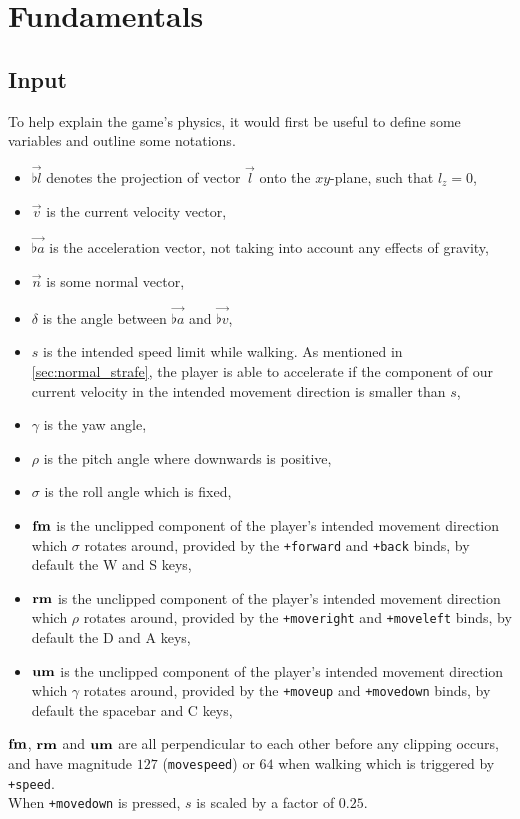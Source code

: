 \section{Fundamentals}
\label{sec:fundamentals}
\cite{hl_physics}

\subsection{Input}
\label{sec:input}
To help explain the game's physics, it would first be useful to define some variables and outline some notations.
\begin{itemize}
\item $\vec{\flat{l}}$ denotes the projection of vector $\vec{l}$ onto the $xy$-plane, such that $l_z = 0$,
\item $\vec{v}$ is the current velocity vector,
\item $\vec{\flat{a}}$ is the acceleration vector, not taking into account any effects of gravity,
\item $\vec{n}$ is some normal vector,
\item $\delta$ is the angle between $\vec{\flat{a}}$ and $\vec{\flat{v}}$,
\item $s$ is the intended speed limit while walking. As mentioned in \ref{sec:normal_strafe}, the player is able to accelerate if the component of our current velocity in the intended movement direction is smaller than $s$,
\item $\gamma$ is the yaw angle,
\item $\rho$ is the pitch angle where downwards is positive,
\item $\sigma$ is the roll angle which is fixed,
\item $\boldsymbol{\operatorname{fm}}$ is the unclipped component of the player's intended movement direction which $\sigma$ rotates around, provided by the \texttt{+forward} and \texttt{+back} binds, by default the W and S keys,
\item $\boldsymbol{\operatorname{rm}}$ is the unclipped component of the player's intended movement direction which $\rho$ rotates around, provided by the \texttt{+moveright} and \texttt{+moveleft} binds, by default the D and A keys,
\item $\boldsymbol{\operatorname{um}}$ is the unclipped component of the player's intended movement direction which $\gamma$ rotates around, provided by the \texttt{+moveup} and \texttt{+movedown} binds, by default the spacebar and C keys,
\end{itemize}

$\boldsymbol{\operatorname{fm}}$, $\boldsymbol{\operatorname{rm}}$ and $\boldsymbol{\operatorname{um}}$ are all perpendicular to each other before any clipping occurs, and have magnitude $127$ (\texttt{movespeed}) or $64$ when walking which is triggered by \texttt{+speed}.\\
When \texttt{+movedown} is pressed, $s$ is scaled by a factor of $0.25$.

